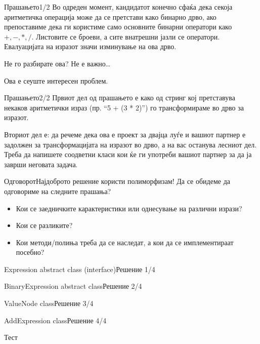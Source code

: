 \begin{frame}{Прашањето}{1/2}
Во одреден момент, кандидатот конечно сфаќа дека секоја аритметичка операција
може да се претстави како бинарно дрво, ако препоставиме дека ги користиме само
основните бинарни оператори како $+, -, *, /$. Листовите се броеви, а
сите внатрешни јазли се оператори. Евалуацијата на изразот значи изминување на ова
дрво. 

Не го разбирате ова? Не е важно\ldots

Ова е сеуште интересен проблем.
\end{frame}

\begin{frame}{Прашањето}{2/2}
Првиот дел од прашањето е како од стринг кој претставува некаков аритметички
израз (пр. ``5 + (3 * 2)'') го трансформираме во дрво за изразот.

Вториот дел е: да речеме дека ова е проект за двајца луѓе и вашиот партнер е
задолжен за трансформацијата на изразот во дрво, а на вас останува лесниот дел.
Треба да напишете соодветни класи кои ќе ги употреби вашиот партнер за да ја
заврши неговата задача.

\end{frame}

\begin{frame}{Одговорот}{Најдоброто решение користи полиморфизам!}
Да се обидеме да одговориме на следните прашања?
\begin{itemize}
  \item Кои се заедничките карактеристики или однесување на различни изрази?
  \item Кои се разликите?
  \item Кои методи/полиња треба да се наследат, а кои да се имплементираат
  посебно?
\end{itemize}

\end{frame}


\begin{frame}[fragile]{Expression abstract class (interface)}{Решение 1/4}

\end{frame}

\begin{frame}[fragile]{BinaryExpression abstract class}{Решение 2/4}

\end{frame}

\begin{frame}[fragile]{ValueNode class}{Решение 3/4}

\end{frame}

\begin{frame}[fragile]{AddExpression class}{Решение 4/4}

\end{frame}

\begin{frame}[fragile]{Тест}

\end{frame}

